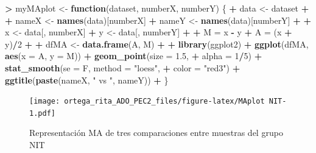 \documentclass[
  english,
]{article}
\newenvironment{Shaded}{\begin{snugshade}}{\end{snugshade}}
\newcommand{\ControlFlowTok}[1]{\textcolor[rgb]{0.13,0.29,0.53}{\textbf{#1}}}
\newcommand{\DataTypeTok}[1]{\textcolor[rgb]{0.13,0.29,0.53}{#1}}
\newcommand{\DecValTok}[1]{\textcolor[rgb]{0.00,0.00,0.81}{#1}}
\newcommand{\FloatTok}[1]{\textcolor[rgb]{0.00,0.00,0.81}{#1}}
\newcommand{\KeywordTok}[1]{\textcolor[rgb]{0.13,0.29,0.53}{\textbf{#1}}}
\newcommand{\NormalTok}[1]{#1}
\newcommand{\OperatorTok}[1]{\textcolor[rgb]{0.81,0.36,0.00}{\textbf{#1}}}
\newcommand{\StringTok}[1]{\textcolor[rgb]{0.31,0.60,0.02}{#1}}
\begin{document}
\begin{Shaded}
\begin{Highlighting}[]
\OperatorTok{>}\StringTok{ }\NormalTok{myMAplot <-}\StringTok{ }\ControlFlowTok{function}\NormalTok{(dataset, numberX, numberY) \{}
\OperatorTok{+}\StringTok{     }\NormalTok{data <-}\StringTok{ }\NormalTok{dataset}
\OperatorTok{+}\StringTok{     }
\OperatorTok{+}\StringTok{     }\NormalTok{nameX <-}\StringTok{ }\KeywordTok{names}\NormalTok{(data)[numberX]}
\OperatorTok{+}\StringTok{     }\NormalTok{nameY <-}\StringTok{ }\KeywordTok{names}\NormalTok{(data)[numberY]}
\OperatorTok{+}\StringTok{     }
\OperatorTok{+}\StringTok{     }\NormalTok{x <-}\StringTok{ }\NormalTok{data[, numberX]}
\OperatorTok{+}\StringTok{     }\NormalTok{y <-}\StringTok{ }\NormalTok{data[, numberY]}
\OperatorTok{+}\StringTok{     }
\OperatorTok{+}\StringTok{     }\NormalTok{M =}\StringTok{ }\NormalTok{x }\OperatorTok{-}\StringTok{ }\NormalTok{y}
\OperatorTok{+}\StringTok{     }\NormalTok{A =}\StringTok{ }\NormalTok{(x }\OperatorTok{+}\StringTok{ }\NormalTok{y)}\OperatorTok{/}\DecValTok{2}
\OperatorTok{+}\StringTok{     }
\OperatorTok{+}\StringTok{     }\NormalTok{dfMA <-}\StringTok{ }\KeywordTok{data.frame}\NormalTok{(A, M)}
\OperatorTok{+}\StringTok{     }
\OperatorTok{+}\StringTok{     }\KeywordTok{library}\NormalTok{(ggplot2)}
\OperatorTok{+}\StringTok{     }\KeywordTok{ggplot}\NormalTok{(dfMA, }\KeywordTok{aes}\NormalTok{(}\DataTypeTok{x =}\NormalTok{ A, }\DataTypeTok{y =}\NormalTok{ M)) }\OperatorTok{+}\StringTok{ }\KeywordTok{geom_point}\NormalTok{(}\DataTypeTok{size =} \FloatTok{1.5}\NormalTok{, }
\OperatorTok{+}\StringTok{         }\DataTypeTok{alpha =} \DecValTok{1}\OperatorTok{/}\DecValTok{5}\NormalTok{) }\OperatorTok{+}\StringTok{ }\KeywordTok{stat_smooth}\NormalTok{(}\DataTypeTok{se =}\NormalTok{ F, }\DataTypeTok{method =} \StringTok{"loess"}\NormalTok{, }
\OperatorTok{+}\StringTok{         }\DataTypeTok{color =} \StringTok{"red3"}\NormalTok{) }\OperatorTok{+}\StringTok{ }\KeywordTok{ggtitle}\NormalTok{(}\KeywordTok{paste}\NormalTok{(nameX, }\StringTok{" vs "}\NormalTok{, nameY))}
\OperatorTok{+}\StringTok{ }\NormalTok{\}}
\end{Highlighting}
\end{Shaded}

\begin{figure}
\centering
\texttt{[image: ortega\_rita\_ADO\_PEC2\_files/figure-latex/MAplot NIT-1.pdf]}
\caption{Representación MA de tres comparaciones entre muestras del
grupo NIT}
\end{figure}
\end{document}
